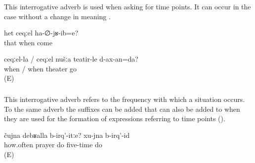 
\subsubsection{ }
\label{sssec:ceqel when}

This interrogative adverb is used when asking for time points. It can occur in the  case without a change in meaning .

\begin{exe}
	\ex	\label{ex:When did he come}
	\gll	het	ceqːel	ha-∅-jʁ-ib=e?\\
		that	when	come\\
	\glt	{}
\end{exe}
%


\begin{exe}
	\ex	\label{ex:When will we go to the theater?}
	\gll	ceqːel-la	/	ceqːel	nušːa	teatir-le	d-ax-an=da?\\
		when	/	when		theater	go\\
	\glt	{} (E)
\end{exe}



\subsubsection{ }
\label{sssec:cujna how many times}

This interrogative adverb refers to the frequency with which a situation occurs. To the same adverb the suffixes can be added that can also be added to  when they are used for the formation of expressions referring to time points  ().

\begin{exe}
	\ex	\label{ex:How many times do you pray (every day)? I pray five times}
	\gll	čujna	debʁalla	b-irq'-itːe? 	xu-jna	b-irq'-id\\
		how.often	prayer	do 	five-time	do\\
	\glt	{} (E)
\end{exe}


